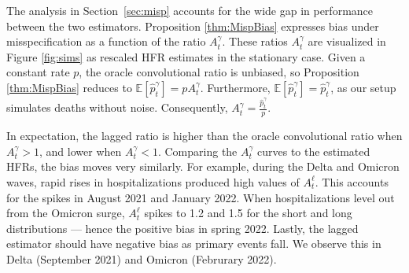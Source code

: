 \documentclass{article}
\renewcommand{\hat}{\widehat} %
\begin{document}
The analysis in Section~\ref{sec:misp} accounts for the wide gap in performance between the two estimators. 
Proposition \ref{thm:MispBias} expresses bias under misspecification as a function of the ratio $A_t^\gamma$. 
These ratios $A_t^\gamma$ are visualized in Figure \ref{fig:sims} as rescaled HFR estimates in the stationary case.
Given a constant rate $p$, the oracle convolutional ratio is unbiased, so Proposition \ref{thm:MispBias} reduces to $\mathbb{E}[\hat{p}_t^\gamma] = p A_t^\gamma$. Furthermore, $\mathbb{E}[\hat{p}_t^\gamma] = \hat{p}_t^\gamma$, as our setup simulates deaths without noise. Consequently, $A_t^\gamma = \frac{\hat{p}_t^\gamma }{p}$. 

In expectation, the lagged ratio is higher than the oracle convolutional ratio when $A_t^\gamma>1$, and lower when $A_t^\gamma<1$. Comparing the $A_t^\gamma$ curves to the estimated HFRs, the bias moves very similarly. 
For example, 
during the Delta and Omicron waves, rapid rises in hospitalizations produced high values of $A_t^\ell$. This accounts for the spikes in August 2021 and January 2022. %
When hospitalizations level out from the Omicron surge, $A_t^\ell$ spikes to 1.2 and 1.5 for the short and long distributions --- hence the positive bias in spring 2022. 
Lastly, the lagged estimator should have negative bias as primary events fall. We observe this in Delta (September 2021) and Omicron (Februrary 2022). 
\end{document}

